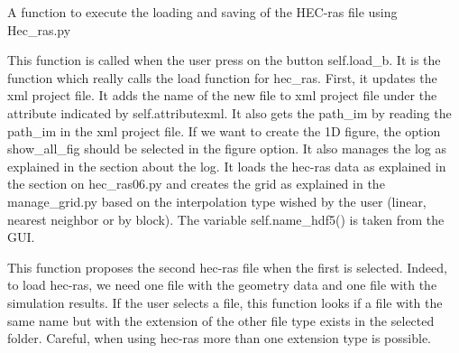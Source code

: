 \documentclass[letterpaper,10pt,english]{sphinxmanual}
\begin{document}
\begin{fulllineitems}
\begin{fulllineitems}
\end{fulllineitems}


\begin{fulllineitems}
\label{\detokenize{index:src_GUI.hydro_GUI_2.HEC_RAS1D.load_hec_ras_gui}}
A function to execute the loading and saving of the HEC-ras file using Hec\_ras.py


This function is called when the user press on the button self.load\_b. It is the function which really
calls the load function for hec\_ras. First, it updates the xml project file. It adds the name of the new file
to xml project file under the attribute indicated by self.attributexml. It also gets the path\_im by reading the
path\_im in the xml project file. If we want to create the 1D figure, the option show\_all\_fig
should be selected in the figure option. It also manages the log as explained in the section about the log.
It loads the hec-ras data as explained in the section on hec\_ras06.py and creates the grid as explained
in the manage\_grid.py based on the interpolation type wished by the user (linear, nearest neighbor or by block).
The variable self.name\_hdf5() is taken from the GUI.

\end{fulllineitems}


\begin{fulllineitems}
\label{\detokenize{index:src_GUI.hydro_GUI_2.HEC_RAS1D.propose_next_file}}
This function proposes the second hec-ras file when the first is selected.  Indeed, to load hec-ras, we need
one file with the geometry data and one file with the simulation results. If the user selects a file, this
function looks if a file with the same name but with the extension of the other file type exists in the
selected folder. Careful, when using hec-ras more than one extension type is possible.

\end{fulllineitems}


\end{fulllineitems}

\end{document}
